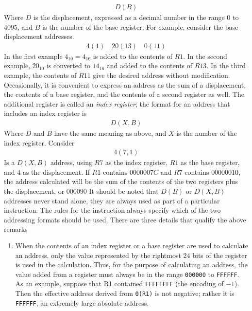 \documentclass{report}
\begin{document}
\begin{itemize}
            \begin{align*}
                D(B)
            \end{align*}
            Where $D$ is the displacement, expressed as a decimal number in the range 0 to 4095, and $B$ is the number of the base register.
            \bigbreak \noindent 
            For example, consider the base-displacement addresses.
            \begin{align*}
               4(1) \quad 20(13) \quad 0(11) 
            \end{align*}
            In the first example $4_{10} = 4_{16}$ is added to the contents of $R1$. In the second example, $20_{10}$ is converted to $14_{16}$ and added to the contents of $R13$. In the third example, the contents of $R11$ give the desired address without modification.
            \bigbreak \noindent 
            Occasionally, it is convenient to express an address as the sum of a displacement, the contents of a base register, and the contents of a second register as well. The additional register is called an \textit{index register}; the format for an address that includes an index register is
            \begin{align*}
                D(X,B)
            \end{align*}
            Where $D$ and $B$ have the same meaning as above, and $X$ is the number of the index register. Consider 
            \begin{align*}
                4(7,1)
            \end{align*}
            Is a $D(X,B)$ address, using $R7$ as the index register, $R1$ as the base register, and $4$ as the displacement. If $R1$ contains $0000007C$ and $R7$ contains $00000010$, the address calculated will be the sum of the contents of the two registers plus the displacement, or $000090$
            \bigbreak \noindent 
            It should be noted that $D(B)$ or $D(X,B)$ addresses never stand alone, they are always used as part of a particular instruction. The rules for the instruction always specify which of the two addressing formats should be used.
            \bigbreak \noindent 
            There are three details that qualify the above remarks
            \begin{enumerate}
                \item When the contents of an index register or a base register are used to calculate an address, only the value represented by the rightmost 24 bits of the register is used in the calculation. Thus, for the purpose of calculating an address, the value added from a register must always be in the range \texttt{000000} to \texttt{FFFFFF}. As an example, suppose that R1 contained \texttt{FFFFFFFF} (the encoding of $-1$). Then the effective address derived from \texttt{0(R1)} is not negative; rather it is \texttt{FFFFFF}, an extremely large absolute address.

\end{enumerate}
\end{itemize}
\end{document}
